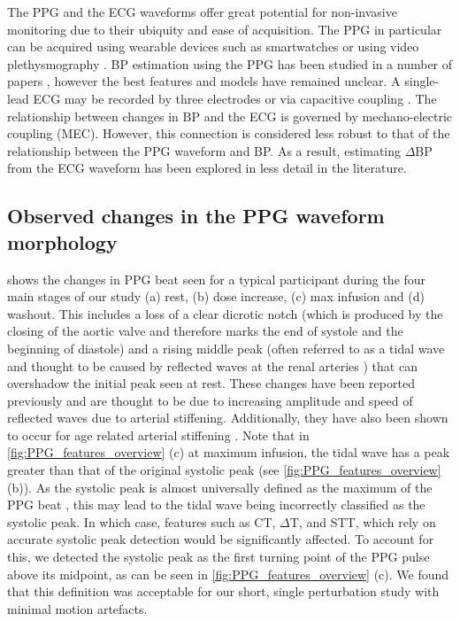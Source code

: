 \documentclass[fleqn,10pt]{wlscirep}
\begin{document}

The PPG and the ECG waveforms offer great potential for non-invasive monitoring due to their ubiquity and ease of acquisition. The PPG in particular can be acquired using wearable devices such as smartwatches or using video plethysmography \cite{Elgendi2019}. BP estimation using the PPG has been studied in a number of papers \cite{Elgendi2019}, however the best features and models have remained unclear. A single-lead ECG may be recorded by three electrodes or via capacitive coupling \cite{Taji2013}. The relationship between changes in BP and the ECG is governed by mechano-electric coupling (MEC). However, this connection is considered less robust to that of the relationship between the PPG waveform and BP. As a result, estimating $\Delta$BP from the ECG waveform has been explored in less detail in the literature. 

\subsection{Observed changes in the PPG waveform morphology}
 shows the changes in PPG beat seen for a typical participant during the four main stages of our study (a) rest, (b) dose increase, (c) max infusion and (d) washout. This includes a loss of a clear dicrotic notch (which is produced by the closing of the aortic valve and therefore marks the end of systole and the beginning of diastole) and a rising middle peak (often referred to as a tidal wave \cite{VonWowern2015} and thought to be caused by reflected waves at the renal arteries \cite{Baruch2011}) that can overshadow the initial peak seen at rest. These changes have been reported previously \cite{Sun2016,Sola2019,Elgendi2012} and are thought to be due to increasing amplitude and speed of reflected waves due to arterial stiffening. Additionally, they have also been shown to occur for age related arterial stiffening \cite{VonWowern2015}. Note that in \cref{fig:PPG_features_overview} (c) at maximum infusion, the tidal wave has a peak greater than that of the original systolic peak (see \cref{fig:PPG_features_overview} (b)). As the systolic peak is almost universally defined as the maximum of the PPG beat \cite{Charlton2018}, this may lead to the tidal wave being incorrectly classified as the systolic peak. In which case, features such as CT, $\Delta$T, and STT, which rely on accurate systolic peak detection would be significantly affected. To account for this, we detected the systolic peak as the first turning point of the PPG pulse above its midpoint, as can be seen in \cref{fig:PPG_features_overview} (c). We found that this definition was acceptable for our short, single perturbation study with minimal motion artefacts. 
\end{document}
